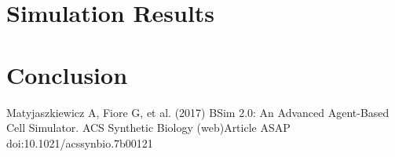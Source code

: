 \documentclass[conference]{IEEEtran}
\begin{document}
\section{Simulation Results}

\section{Conclusion}

\begin{thebibliography}{00}
 Matyjaszkiewicz A, Fiore G, et al. (2017) BSim 2.0: An Advanced Agent-Based Cell Simulator. ACS Synthetic Biology (web)Article ASAP doi:10.1021/acssynbio.7b00121
\vspace{12pt}
\color{red}
\end{thebibliography}
\end{document}
